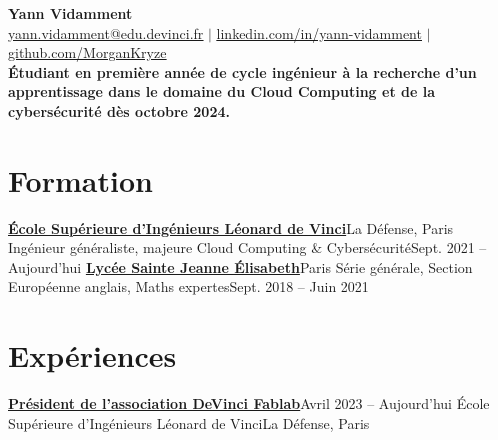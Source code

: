 \documentclass[letterpaper,11pt]{article}
\begin{document}
\begin{center}
  \textbf{\Huge Yann Vidamment} \\ \vspace{1pt}
  \href{mailto:yann.vidamment@edu.devinci.fr}{\underline{yann.vidamment@edu.devinci.fr}} $|$ 
  \href{https://linkedin.com/in/yann-vidamment-80a512254/}{\underline{linkedin.com/in/yann-vidamment}} $|$
  \href{https://github.com/MorganKryze}{\underline{github.com/MorganKryze}} \\
  \vspace{6pt}
  \textbf{\small{Étudiant en première année de cycle ingénieur à la recherche d'un apprentissage dans le domaine du Cloud Computing et de la cybersécurité dès octobre 2024.}}
\end{center}

\section{Formation}
  \resumeSubHeadingListStart
    \resumeSubheading
      {\href{https://www.esilv.fr/}{\textbf{École Supérieure d'Ingénieurs Léonard de Vinci}}}{La Défense, Paris}
      {Ingénieur généraliste, majeure Cloud Computing \& Cybersécurité}{Sept. 2021 -- Aujourd'hui}
    \resumeSubheading
      {\href{https://www.ste-jeanne-elisabeth.com/}{\textbf{Lycée Sainte Jeanne Élisabeth}}}{Paris}
      {Série générale, Section Européenne anglais, Maths expertes}{Sept. 2018 -- Juin 2021}
  \resumeSubHeadingListEnd

\section{Expériences}
  \resumeSubHeadingListStart
    \resumeSubheading
      {\href{https://dvic.devinci.fr/fablab/}{\textbf{Président de l'association DeVinci Fablab}}}{Avril 2023 -- Aujourd'hui}
      {École Supérieure d'Ingénieurs Léonard de Vinci}{La Défense, Paris}
      \resumeItemListStart
      \resumeItemListEnd
\end{document}
